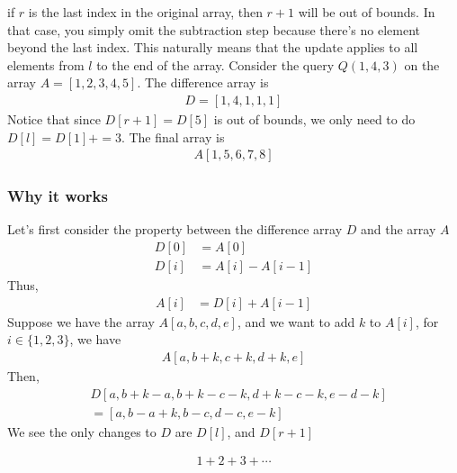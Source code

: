 \documentclass{report}
\begin{document}
    \bigbreak \noindent 
    if $r$ is the last index in the original array, then $r+1$ will be out of bounds. In that case, you simply omit the subtraction step because there's no element beyond the last index. This naturally means that the update applies to all elements from $l$ to the end of the array. Consider the query $Q(1,4,3)$ on the array $A = [1,2,3,4,5]$. The difference array is 
    \begin{align*}
        D = [1,4,1,1,1]
    \end{align*}
    Notice that since $D[r+1] = D[5]$ is out of bounds, we only need to do $D[l] = D[1]+=3$. The final array is 
    \begin{align*}
        A[1,5,6,7,8]
    \end{align*}

    \bigbreak \noindent 
    \subsubsection{Why it works}
    \bigbreak \noindent 
    Let's first consider the property between the difference array $D$ and the array $A$
    \begin{align*}
        D[0] &= A[0] \\
        D[i] &= A[i] - A[i-1]
    \end{align*}
    Thus,
    \begin{align*}
        A[i] &= D[i] + A[i-1]
    \end{align*}
    Suppose we have the array $A[a,b,c,d,e]$, and we want to add $k$ to $A[i]$, for $i \in \{1,2,3\} $, we have
    \begin{align*}
        A[a,b+k, c+k, d+k, e]
    \end{align*}
    Then, 
    \begin{align*}
    &D[a, b+k-a, b+k-c-k, d+k-c-k, e-d-k] \\
    &=[a, b-a+k, b-c, d-c, e-k]
    \end{align*}
    We see the only changes to $D$ are $D[l]$, and $D[r+1]$

    \begin{align*}
        1 + 2 + 3 + \cdots
    \end{align*}
\end{document}
